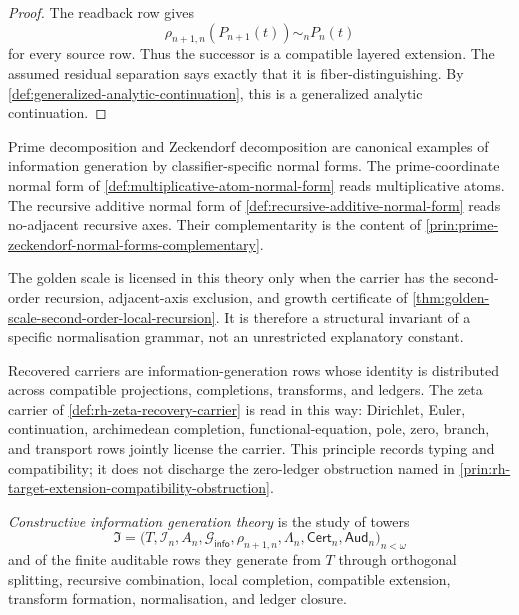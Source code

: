 \begin{proof}
The readback row gives
$$
\rho_{n+1,n}(P_{n+1}(t))\sim_n P_n(t)
$$
for every source row. Thus the successor is a compatible layered
extension. The assumed residual separation says exactly that it is
fiber-distinguishing. By
\autoref{def:generalized-analytic-continuation}, this is a generalized
analytic continuation.
\end{proof}

\begin{principle}
\label{prin:normal-forms-information-generation-classifiers}
Prime decomposition and Zeckendorf decomposition are canonical examples
of information generation by classifier-specific normal forms. The
prime-coordinate normal form of
\autoref{def:multiplicative-atom-normal-form} reads multiplicative
atoms. The recursive additive normal form of
\autoref{def:recursive-additive-normal-form} reads no-adjacent
recursive axes. Their complementarity is the content of
\autoref{prin:prime-zeckendorf-normal-forms-complementary}.
\end{principle}

\begin{principle}
\label{prin:information-generation-golden-scale}
The golden scale is licensed in this theory only when the carrier has
the second-order recursion, adjacent-axis exclusion, and growth
certificate of
\autoref{thm:golden-scale-second-order-local-recursion}. It is therefore
a structural invariant of a specific normalisation grammar, not an
unrestricted explanatory constant.
\end{principle}

\begin{principle}
\label{prin:recovered-carriers-ledgered-information}
Recovered carriers are information-generation rows whose identity is
distributed across compatible projections, completions, transforms, and
ledgers. The zeta carrier of \autoref{def:rh-zeta-recovery-carrier} is
read in this way: Dirichlet, Euler, continuation, archimedean
completion, functional-equation, pole, zero, branch, and transport rows
jointly license the carrier. This principle records typing and
compatibility; it does not discharge the zero-ledger obstruction named
in \autoref{prin:rh-target-extension-compatibility-obstruction}.
\end{principle}

\begin{definition}
\label{def:constructive-information-generation-theory}
\emph{Constructive information generation theory} is the study of
towers
$$
\mathfrak I
=
\bigl(T,\mathcal I_n,A_n,\mathcal G_{\mathsf{info}},
\rho_{n+1,n},\Lambda_n,\mathsf{Cert}_n,\mathsf{Aud}_n\bigr)_{n<\omega}
$$
and of the finite auditable rows they generate from $T$ through
orthogonal splitting, recursive combination, local completion,
compatible extension, transform formation, normalisation, and ledger
closure.
\end{definition}

